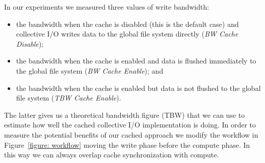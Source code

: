In our experiments we measured three values of write bandwidth: 

\begin{itemize}
\item the bandwidth when the cache is disabled (this is the default case) and collective I/O writes data to the global file system directly (\textit{BW Cache Disable}); 
\item the bandwidth when the cache is enabled and data is flushed immediately to the global file system (\textit{BW Cache Enable}); and 
\item the bandwidth when the cache is enabled but data is not flushed to the global file system (\textit{TBW Cache Enable}). 
\end{itemize}

The latter gives us a theoretical bandwidth figure (TBW) that we can use to estimate how well the cached collective I/O implementation is doing. In order to measure the potential 
benefits of our cached approach we modify the workflow in Figure~\ref{figure: workflow} moving the write phase before the compute phase. In this way we can always overlap cache 
synchronization with compute.

